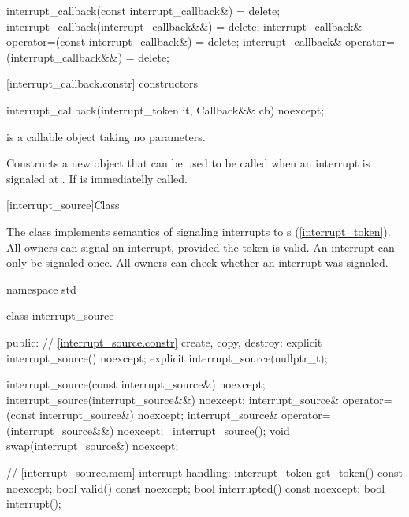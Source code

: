 {\begin{codeblock}
{{    interrupt_callback(const interrupt_callback&) = delete;
    interrupt_callback(interrupt_callback&&) = delete;
    interrupt_callback& operator=(const interrupt_callback&) = delete;
    interrupt_callback& operator=(interrupt_callback&&) = delete;
  }
}
\end{codeblock}

[interrupt_callback.constr]{ constructors}

%
\begin{itemdecl}
interrupt_callback(interrupt_token it, Callback&& cb) noexcept;
\end{itemdecl}
\begin{itemdescr}
  \pnum\requires {} is a callable object taking no parameters.

  \pnum\effects Constructs a new  object that can be used to be called when an interrupt
                is signaled at .
                If   is immediatelly called.
\end{itemdescr}

%
[interrupt_source]{Class }

\pnum
{}%
The class  implements semantics of signaling interrupts
to s (\ref{interrupt_token}).
All owners can signal an interrupt, provided the token is valid.
An interrupt can only be signaled once.
All owners can check whether an interrupt was signaled.

\begin{codeblock}
namespace std {
  class interrupt_source {
  public:
    // \ref{interrupt_source.constr} create, copy, destroy:
    explicit interrupt_source() noexcept;
    explicit interrupt_source(nullptr_t);

    interrupt_source(const interrupt_source&) noexcept;
    interrupt_source(interrupt_source&&) noexcept;
    interrupt_source& operator=(const interrupt_source&) noexcept;
    interrupt_source& operator=(interrupt_source&&) noexcept;
    ~interrupt_source();
    void swap(interrupt_source&) noexcept;

    // \ref{interrupt_source.mem} interrupt handling:
    interrupt_token get_token() const noexcept;
    bool valid() const noexcept;
    bool interrupted() const noexcept;
    bool interrupt();

}}
\end{codeblock}}
